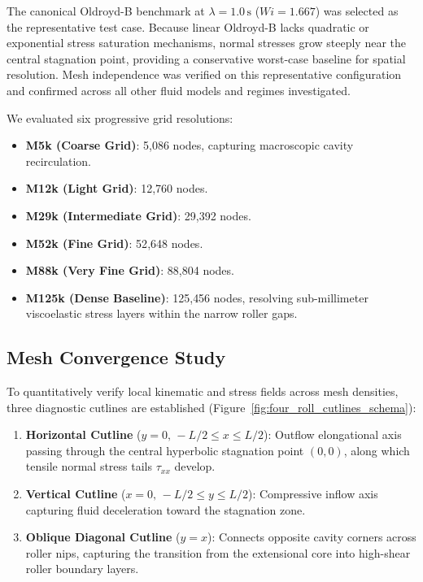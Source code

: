 The canonical Oldroyd-B benchmark at $\lambda = 1.0\,\mathrm{s}$ ($Wi =
1.667$) was selected as the representative test case. Because linear Oldroyd-B
lacks quadratic or exponential stress saturation mechanisms, normal stresses
grow steeply near the central stagnation point, providing a conservative
worst-case baseline for spatial resolution. Mesh independence was verified on
this representative configuration and confirmed across all other fluid models
and regimes investigated.

We evaluated six progressive grid resolutions:
\begin{itemize}[noitemsep, topsep=3pt, parsep=1pt]
    \item \textbf{M5k (Coarse Grid)}: 5{,}086 nodes, capturing macroscopic cavity
        recirculation.
    \item \textbf{M12k (Light Grid)}: 12{,}760 nodes.
    \item \textbf{M29k (Intermediate Grid)}: 29{,}392 nodes.
    \item \textbf{M52k (Fine Grid)}: 52{,}648 nodes.
    \item \textbf{M88k (Very Fine Grid)}: 88{,}804 nodes.
    \item \textbf{M125k (Dense Baseline)}: 125{,}456 nodes, resolving
        sub-millimeter viscoelastic stress layers within the narrow roller gaps.
\end{itemize}

\subsection{Mesh Convergence Study}
\label{subsec:mesh_convergence_study}

To quantitatively verify local kinematic and stress fields across mesh densities,
three diagnostic cutlines are established
(Figure~\ref{fig:four_roll_cutlines_schema}):
\begin{enumerate}[noitemsep, topsep=3pt, parsep=1pt]
    \item \textbf{Horizontal Cutline} ($y = 0, \, -L/2 \le x \le L/2$):
        Outflow elongational axis passing through the central hyperbolic stagnation
        point $(0, 0)$, along which tensile normal stress tails $\tau_{xx}$ develop.
    \item \textbf{Vertical Cutline} ($x = 0, \, -L/2 \le y \le L/2$):
        Compressive inflow axis capturing fluid deceleration toward the stagnation
        zone.
    \item \textbf{Oblique Diagonal Cutline} ($y = x$):
        Connects opposite cavity corners across roller nips, capturing the
        transition from the extensional core into high-shear roller boundary layers.
\end{enumerate}

